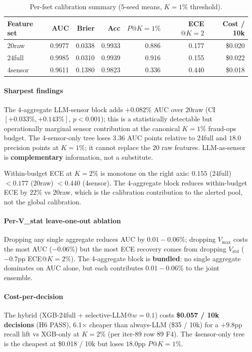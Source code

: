 \documentclass{article}
\begin{document}
\begin{table}[h]
\centering\small
\caption{Per-fset calibration summary (5-seed means, $K{=}1\%$ threshold).}
\label{tab:p8-iter176-calib}
\begin{tabular}{lrrrrrr}
\hline
Feature set & AUC & Brier & Acc & $P@K{=}1\%$ & ECE$@K{=}2$ & Cost / 10k \\
\hline
20raw  & 0.9977 & 0.0338 & 0.9933 & 0.886 & 0.177 & \$0.020 \\
24full & 0.9985 & 0.0310 & 0.9939 & 0.916 & 0.155 & \$0.022 \\
4sensor& 0.9611 & 0.1380 & 0.9823 & 0.336 & 0.440 & \$0.018 \\
\hline
\end{tabular}
\end{table}

\paragraph{Sharpest findings}
The 4-aggregate LLM-sensor block adds $+0.082\%$ AUC over 20raw
(CI $[+0.033\%, +0.143\%]$, $p<0.001$); this is a statistically
detectable but operationally marginal sensor contribution at the
canonical $K{=}1\%$ fraud-ops budget. The 4-sensor-only tree loses
$3.36$ AUC points relative to 24full and $18.0$ precision points at
$K{=}1\%$; it cannot replace the 20 raw features. LLM-as-sensor is
\textbf{complementary} information, not a substitute.

Within-budget ECE at $K{=}2\%$ is monotone on the right axis:
$0.155$ (24full) $< 0.177$ (20raw) $< 0.440$ (4sensor).
The 4-aggregate block reduces within-budget ECE by $22\%$ vs 20raw,
which is the calibration contribution to the alerted pool, not the
global calibration.

\paragraph{Per-V_stat leave-one-out ablation}
Dropping any single aggregate reduces AUC by $0.01{-}0.06\%$; dropping
$V_\mathrm{max}$ costs the most AUC ($-0.06\%$) but the most ECE
recovery comes from dropping $V_\mathrm{std}$ ($-0.7$pp ECE@$K{=}2\%$).
The 4-aggregate block is \textbf{bundled}: no single aggregate dominates
on AUC alone, but each contributes $0.01{-}0.06\%$ to the joint ensemble.

\paragraph{Cost-per-decision}
The hybrid (XGB-24full + selective-LLM@$w{=}0.1$) costs
\textbf{\$0.057 / 10k decisions} (H6 PASS), 6.1$\times$ cheaper than
always-LLM (\$35 / 10k) for a $+9.8$pp recall lift vs XGB-only at
$K{=}2\%$ (per iter-89 row 89 F4). The 4sensor-only tree is the
cheapest at \$0.018 / 10k but loses $18.0$pp $P@K{=}1\%$.
\end{document}
